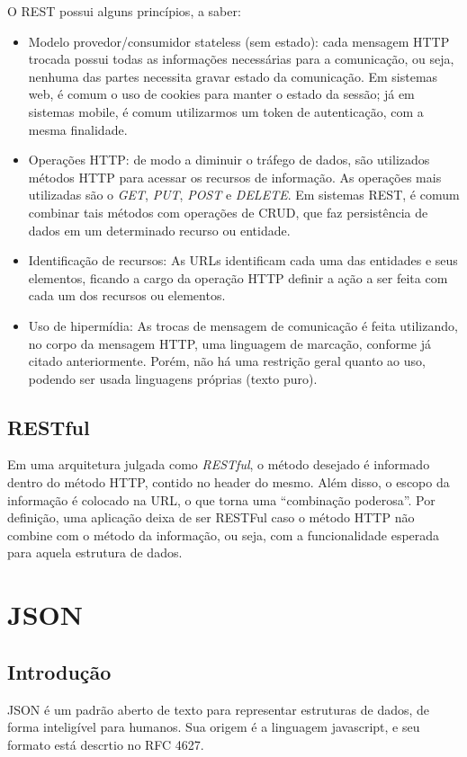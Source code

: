 O \ac{REST} possui alguns princípios, a saber:
\begin{itemize}
\item Modelo provedor/consumidor stateless (sem estado): cada mensagem \ac{HTTP} trocada possui todas as informações necessárias para a comunicação, ou seja, nenhuma das partes necessita gravar estado da comunicação. Em sistemas web, é comum o uso de cookies para manter o estado da sessão; já em sistemas mobile, é comum utilizarmos um token de autenticação, com a mesma finalidade.

\item Operações \ac{HTTP}: de modo a diminuir o tráfego de dados, são utilizados métodos \ac{HTTP} para acessar os recursos de informação. As operações mais utilizadas são o \emph{GET}, \emph{PUT}, \emph{POST} e \emph{DELETE}. Em sistemas \ac{REST}, é comum combinar tais métodos com operações de \ac{CRUD}, que faz persistência de dados em um determinado recurso ou entidade.

\item Identificação de recursos: As URLs identificam cada uma das entidades e seus elementos, ficando a cargo da operação \ac{HTTP} definir a ação a ser feita com cada um dos recursos ou elementos.

\item Uso de hipermídia: As trocas de mensagem de comunicação é feita utilizando, no corpo da mensagem \ac{HTTP}, uma linguagem de marcação, conforme já citado anteriormente. Porém, não há uma restrição geral quanto ao uso, podendo ser usada linguagens próprias (texto puro).

\end{itemize}
\subsection{RESTful}

	Em uma arquitetura julgada como \emph{RESTful}, o método desejado é informado dentro do método \ac{HTTP}, contido no header do mesmo. Além disso, o escopo da informação é colocado na \ac{URL}, o que torna uma ``combinação poderosa''. Por definição, uma aplicação deixa de ser RESTFul caso o método \ac{HTTP} não combine com o método da informação, ou seja, com a funcionalidade esperada para aquela estrutura de dados. \cite{restfulws}

\section{JSON}
\subsection{Introdução}
\ac{JSON} é um padrão aberto de texto para representar estruturas de dados, de forma inteligível para humanos.  Sua origem é a linguagem javascript, e seu formato está descrtio no RFC 4627.

